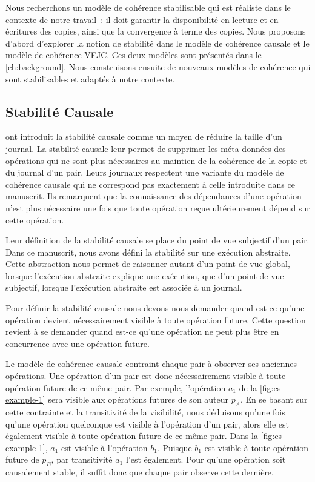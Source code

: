 Nous recherchons un modèle de cohérence stabilisable qui est réaliste dans le contexte de notre travail~: il doit garantir la disponibilité en lecture et en écritures des copies, ainsi que la convergence à terme des copies.
Nous proposons d'abord d'explorer la notion de stabilité dans le modèle de cohérence causale et le modèle de cohérence \acl{VFJC}.
Ces deux modèles sont présentés dans le \autoref{ch:background}.
Nous construisons ensuite de nouveaux modèles de cohérence qui sont stabilisables et adaptés à notre contexte.


\subsection{Stabilité Causale}\label{subsec:cs}

\textcite{baquero_2018_pure-op-crdt} ont introduit la stabilité causale comme un moyen de réduire la taille d'un journal.
La stabilité causale leur permet de supprimer les méta-données des opérations qui ne sont plus nécessaires au maintien de la cohérence de la copie et du journal d'un pair.
Leurs journaux respectent une variante du modèle de cohérence causale qui ne correspond pas exactement à celle introduite dans ce manuscrit.
Ils remarquent que la connaissance des dépendances d'une opération n'est plus nécessaire une fois que toute opération reçue ultérieurement dépend sur cette opération.

Leur définition de la stabilité causale se place du point de vue subjectif d'un pair.
Dans ce manuscrit, nous avons défini la stabilité sur une exécution abstraite.
Cette abstraction nous permet de raisonner autant d'un point de vue global, lorsque l'exécution abstraite explique une exécution, que d'un point de vue subjectif, lorsque l'exécution abstraite est associée à un journal.

Pour définir la stabilité causale nous devons nous demander quand est-ce qu'une opération devient nécessairement visible à toute opération future.
Cette question revient à se demander quand est-ce qu'une opération ne peut plus être en concurrence avec une opération future.

Le modèle de cohérence causale contraint chaque pair à observer ses anciennes opérations.
Une opération d'un pair est donc nécessairement visible à toute opération future de ce même pair.
Par exemple, l'opération $a_1$ de la \autoref{fig:cs-example-1} sera visible aux opérations futures de son auteur $p_A$.
En se basant sur cette contrainte et la transitivité de la visibilité, nous déduisons qu'une fois qu'une opération quelconque est visible à l'opération d'un pair, alors elle est également visible à toute opération future de ce même pair.
Dans la \autoref{fig:cs-example-1}, $a_1$ est visible à l'opération $b_1$.
Puisque $b_1$ est visible à toute opération future de $p_B$, par transitivité $a_1$ l'est également.
Pour qu'une opération soit causalement stable, il suffit donc que chaque pair observe cette dernière.

